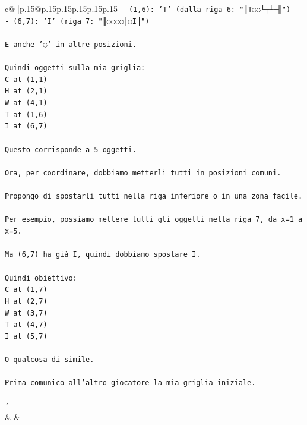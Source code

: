 \documentclass{article}
\begin{document}
{\begin{supertabular}{c@{$\;$}|p{.15\linewidth}@{}p{.15\linewidth}p{.15\linewidth}p{.15\linewidth}p{.15\linewidth}p{.15\linewidth}}
{{{\texttt{{-} (1,6): 'T'  (dalla riga 6: "║T◌◌└┬┴─╢")} \\
\texttt{{-} (6,7): 'I'  (riga 7: "║◌◌◌◌│◌I║")} \\
\\ 
\texttt{E anche '◌' in altre posizioni.} \\
\\ 
\texttt{Quindi oggetti sulla mia griglia:} \\
\texttt{C at (1,1)} \\
\texttt{H at (2,1)} \\
\texttt{W at (4,1)} \\
\texttt{T at (1,6)} \\
\texttt{I at (6,7)} \\
\\ 
\texttt{Questo corrisponde a 5 oggetti.} \\
\\ 
\texttt{Ora, per coordinare, dobbiamo metterli tutti in posizioni comuni.} \\
\\ 
\texttt{Propongo di spostarli tutti nella riga inferiore o in una zona facile.} \\
\\ 
\texttt{Per esempio, possiamo mettere tutti gli oggetti nella riga 7, da x=1 a x=5.} \\
\\ 
\texttt{Ma (6,7) ha già I, quindi dobbiamo spostare I.} \\
\\ 
\texttt{Quindi obiettivo: } \\
\texttt{C at (1,7)} \\
\texttt{H at (2,7)} \\
\texttt{W at (3,7)} \\
\texttt{T at (4,7)} \\
\texttt{I at (5,7)} \\
\\ 
\texttt{O qualcosa di simile.} \\
\\ 
\texttt{Prima comunico all'altro giocatore la mia griglia iniziale.} \\
\\ 
\texttt{'} \\
            }
        }
    }
    & & \\ \\


\end{supertabular}}
\end{document}
